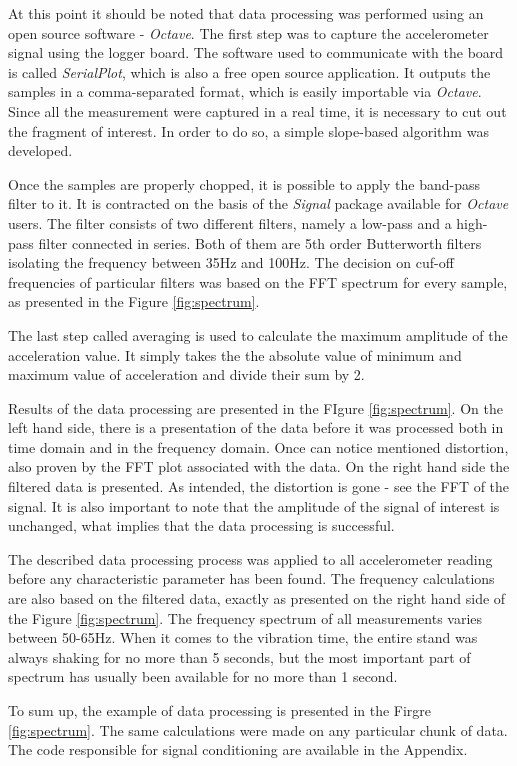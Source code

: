 \documentclass[12pt,a4paper]{article}
\begin{document}
At this point it should be noted that data processing was performed using an open source software - \textit{Octave}. The first step was to capture the accelerometer signal using the logger board. The software used to communicate with the board is called \textit{SerialPlot}, which is also a free open source application. It outputs the samples in a comma-separated format, which is easily importable via \textit{Octave}. Since all the measurement were captured in a real time, it is necessary to cut out the fragment of interest. In order to do so, a simple slope-based algorithm was developed.
\par
Once the samples are properly chopped, it is possible to apply the band-pass filter to it. It is contracted on the basis of the \textit{Signal} package available for \textit{Octave} users. The filter consists of two different filters, namely a low-pass and a high-pass filter connected in series. Both of them are 5th order Butterworth filters isolating the frequency between 35Hz and 100Hz. The decision on cuf-off frequencies of particular filters was based on the FFT spectrum for every sample, as presented in the Figure \ref{fig:spectrum}.
\par
The last step called averaging is used to calculate the maximum amplitude of the acceleration value. It simply takes the the absolute value of minimum and maximum value of acceleration and divide their sum by 2.\par
Results of the data processing are presented in the FIgure \ref{fig:spectrum}. On the left hand side, there is a presentation of the data before it was processed both in time domain and in the frequency domain. Once can notice mentioned distortion, also proven by the FFT plot associated with the data. On the right hand side the filtered data is presented. As intended, the distortion is gone - see the FFT of the signal. It is also important to note that the amplitude of the signal of interest is unchanged, what implies that the data processing is successful.
\par
The described data processing process was applied to all accelerometer reading before any characteristic parameter has been found. The frequency calculations are also based on the filtered data, exactly as presented on the right hand side of the Figure \ref{fig:spectrum}. The frequency spectrum of all measurements varies between 50-65Hz. When it comes to the vibration time, the entire stand was always shaking for no more than 5 seconds, but the most important part of spectrum has usually been available for no more than 1 second. 
\par
To sum up, the example of data processing is presented in the Firgre \ref{fig:spectrum}. The same calculations were made on any particular chunk of data. The code responsible for signal conditioning are available in the Appendix.
\end{document}
